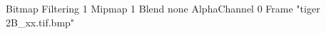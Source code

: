 {Bitmap
	{Filtering 1}
	{Mipmap 1}
	{Blend none}
	{AlphaChannel 0}
	{Frame "tiger 2B_xx.tif.bmp"}
}

